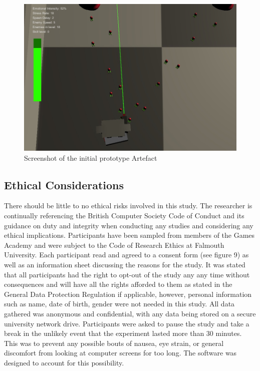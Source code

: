 \documentclass[journal]{IEEEtran}
\begin{document}
\begin{figure}[h]
	\includegraphics[width=1.0\linewidth]{artefactscreenshot.jpg}
	\caption{Screenshot of the initial prototype Artefact}
	\label{Analysis Test}
\end{figure} 

\subsection{Ethical Considerations}
There should be little to no ethical risks involved in this study. The researcher is continually referencing the British Computer Society Code of Conduct \cite{bcs} and its guidance on duty and integrity when conducting any studies and considering any ethical implications. Participants have been sampled from members of the Games Academy and were subject to the Code of Research Ethics at Falmouth University. Each participant read and agreed to a consent form (see figure 9) as well as an information sheet discussing the reasons for the study. It was stated that all participants had the right to opt-out of the study any any time without consequences and will have all the rights afforded to them as stated in the General Data Protection Regulation \cite{gdpr} if applicable, however, personal information such as name, date of birth, gender were not needed in this study. All data gathered was anonymous and confidential, with any data being stored on a secure university network drive. Participants were asked to pause the study and take a break in the unlikely event that the experiment lasted more than 30 minutes. This was to prevent any possible bouts of nausea, eye strain, or general discomfort from looking at computer screens for too long. The software was designed to account for this possibility.
\end{document}
